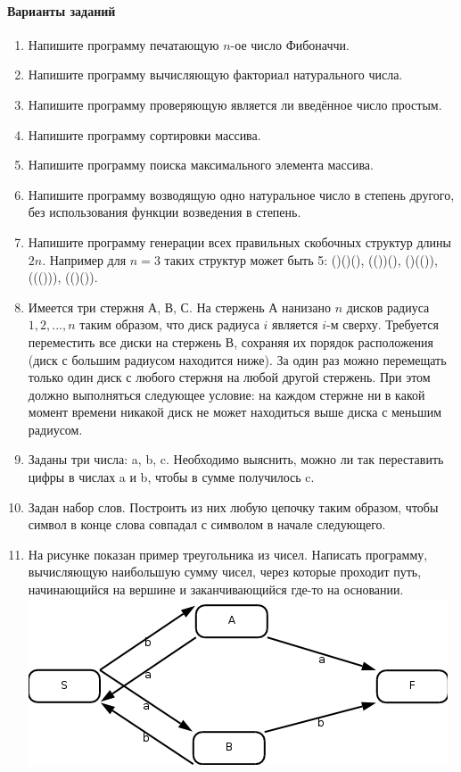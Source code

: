 \documentclass[a4paper,12pt]{article}
\begin{document}
\paragraph{Варианты заданий}
\begin{enumerate}
	\item Напишите программу печатающую $n$-ое число Фибоначчи.
	\item Напишите программу вычисляющую факториал натурального числа.
	\item Напишите программу проверяющую является ли введённое число простым.
	\item Напишите программу сортировки массива.
	\item Напишите программу поиска максимального элемента массива.
	\item Напишите программу возводящую одно натуральное число в степень другого, без использования функции возведения в степень.
	\item Напишите программу генерации всех правильных скобочных структур длины $2n$. Например для $n=3$ таких структур может быть 5: ()()(), (())(), ()(()), ((())), (()()).
	\item Имеется три стержня А, В, С. На стержень А нанизано $n$ дисков радиуса $1, 2,..., n$ таким образом, что диск радиуса $i$ является $i$-м сверху. Требуется переместить все диски на стержень В, сохраняя их порядок расположения (диск с большим радиусом находится ниже). За один раз можно перемещать только один диск с любого стержня на любой другой стержень. При этом должно выполняться следующее условие: на каждом стержне ни в какой момент времени никакой диск не может находиться выше диска с меньшим радиусом. 
	\item Заданы три числа: a, b, c. Необходимо выяснить, можно ли так переставить цифры в числах a и b, чтобы в сумме получилось c.
	\item Задан набор слов. Построить из них любую цепочку таким образом, чтобы символ в конце слова совпадал с символом в начале следующего.
	\item На рисунке показан пример треугольника из чисел. Написать программу, вычисляющую наибольшую сумму чисел, через которые проходит путь, начинающийся на вершине и заканчивающийся где-то на основании. 	
			\includegraphics[scale=1.00]{images/image1.jpg}
		
\end{enumerate}
\end{document}
